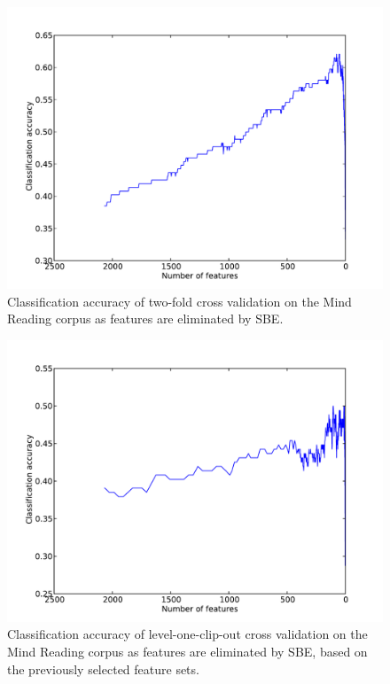\begin{figure}
\centering
\includegraphics[width = 0.8 \columnwidth]{featureselection/mindreading-fs.pdf}
\caption{Classification accuracy of two-fold cross validation on the Mind Reading corpus as features are eliminated by \ac{SBE}.}
\label{FigureMindReadingPerfFeatureSbe}
\end{figure}

\begin{figure}
\centering
\includegraphics[width = 0.8 \columnwidth]{featureselection/mindreading-test.pdf}
\caption{Classification accuracy of level-one-clip-out cross validation on the Mind Reading corpus as features are eliminated by \ac{SBE}, based on the previously selected feature sets.}
\label{FigureMindReadingSbeTestPerf}
\end{figure}

